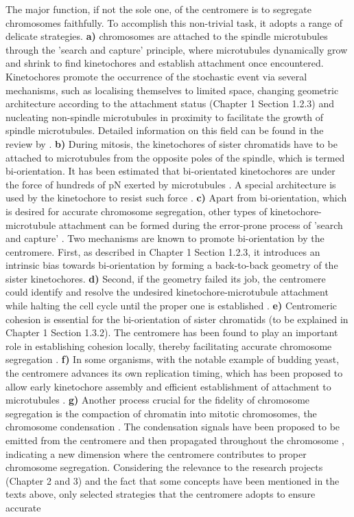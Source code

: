 The major function, if not the sole one, of the centromere is to segregate chromosomes faithfully. To accomplish this non-trivial task, it adopts a range of delicate strategies. \textbf{a)} chromosomes are attached to the spindle microtubules through the 'search and capture' principle, where microtubules dynamically grow and shrink to find kinetochores and establish attachment once encountered. Kinetochores promote the occurrence of the stochastic event via several mechanisms, such as localising themselves to limited space, changing geometric architecture according to the attachment status (Chapter 1 Section 1.2.3) and nucleating non-spindle microtubules in proximity to facilitate the growth of spindle microtubules. Detailed information on this field can be found in the review by \cite{Renda2021RoleMorphogenesis}. \textbf{b)} During mitosis, the kinetochores of sister chromatids have to be attached to microtubules from the opposite poles of the spindle, which is termed bi-orientation. It has been estimated that bi-orientated kinetochores are under the force of hundreds of \si{\pico\newton} exerted by microtubules \citep{Ye2016ChromosomeKinetochore}. A special architecture is used by the kinetochore to resist such force \citep{Suzuki2014TheStretch}. \textbf{c)} Apart from bi-orientation, which is desired for accurate chromosome segregation, other types of kinetochore-microtubule attachment can be formed during the error-prone process of 'search and capture' \citep{Tanaka2010Kinetochore-microtubuleBi-orientation}. Two mechanisms are known to promote bi-orientation by the centromere. First, as described in Chapter 1 Section 1.2.3, it introduces an intrinsic bias towards bi-orientation by forming a back-to-back geometry of the sister kinetochores. \textbf{d)} Second, if the geometry failed its job, the centromere could identify and resolve the undesired kinetochore-microtubule attachment while halting the cell cycle until the proper one is established \citep{Marston2015}. \textbf{e)} Centromeric cohesion is essential for the bi-orientation of sister chromatids (to be explained in Chapter 1 Section 1.3.2). The centromere has been found to play an important role in establishing cohesion locally, thereby facilitating accurate chromosome segregation \citep{Tanaka2013}. \textbf{f)} In some organisms, with the notable example of budding yeast, the centromere advances its own replication timing, which has been proposed to allow early kinetochore assembly and efficient establishment of attachment to microtubules \citep{Tanaka2013}. \textbf{g)} Another process crucial for the fidelity of chromosome segregation is the compaction of chromatin into mitotic chromosomes, the chromosome condensation \citep{Piskadlo2016NovelCondensation}. The condensation signals have been proposed to be emitted from the centromere and then propagated throughout the chromosome \citep{Leonard2015, Wilkins2014AMitosis, Kruitwagen2018, Hendzel1997Mitosis-specificCondensation, Oliveira2007CondensinChromosomes}, indicating a new dimension where the centromere contributes to proper chromosome segregation. Considering the relevance to the research projects (Chapter 2 and 3) and the fact that some concepts have been mentioned in the texts above, only selected strategies that the centromere adopts to ensure accurate 